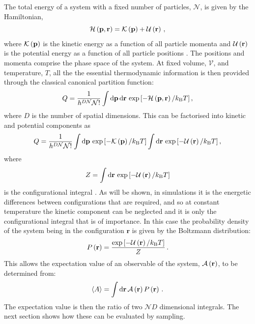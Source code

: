 The total energy of a system with a fixed number of particles, $\mathcal{N}$, is given by the Hamiltonian,
\begin{equation}
	\mathcal{H}\left(\mathbf{p},\mathbf{r}\right) = \mathcal{K}\left(\mathbf{p}\right)+\mathcal{U}\left(\mathbf{r}\right) \,,
\end{equation}
where $\mathcal{K}\left(\mathbf{p}\right)$ is the kinetic energy as a function of all particle momenta and $\mathcal{U}\left(\mathbf{r}\right)$ is the potential energy as a function of all particle positions \cite{Frenkel2002}.
The positions and momenta comprise the phase space of the system.
At fixed volume, $\mathcal{V}$, and temperature, $T$, all the the essential thermodynamic information is then provided through the classical canonical partition function:
\begin{equation}
	Q = \frac{1}{h^{D\mathcal{N}}\mathcal{N}!}\int \text{d}\mathbf{p}\,\text{d}\mathbf{r}\,\exp{\left[-\mathcal{H}\left(\mathbf{p},\mathbf{r}\right)/ k_\text{B}T\right]}\,,
\end{equation}
where $D$ is the number of spatial dimensions.
This can be factorised into kinetic and potential components as
\begin{equation}
	Q = \frac{1}{h^{D\mathcal{N}}\mathcal{N}!}\int \text{d}\mathbf{p}\,\exp{\left[-\mathcal{K}\left(\mathbf{p}\right)/k_\text{B}T\right]} \int \text{d}\mathbf{r}\,\exp{\left[-\mathcal{U}\left(\mathbf{r}\right)/k_\text{B}T\right]} \,,
\end{equation}
where
\begin{equation}
	Z = \int \text{d}\mathbf{r}\,\exp{\left[-\mathcal{U}\left(\mathbf{r}\right)/k_\text{B}T\right]}
\end{equation}
is the configurational integral \cite{Allen2017}. 
As will be shown, in \mc{} simulations it is the energetic differences between configurations that are required, and so at constant temperature the kinetic component can be neglected and it is only the configurational integral that is of importance.
In this case the probability density of the system being in the configuration $\mathbf{r}$ is given by the Boltzmann distribution:
\begin{equation}
	\label{eq:boltzmann}
	P\left(\mathbf{r}\right) = \frac{\exp{\left[-\mathcal{U}\left(\mathbf{r}\right)/k_\text{B}T\right]}}{Z}\,.
\end{equation}
This allows the expectation value of an observable of the system, $\mathcal{A}\left(\mathbf{r}\right)$, to be determined from:
\begin{equation}
	\label{eq:expectationobs}
		\langle A \rangle = \int \text{d}\mathbf{r}\,\mathcal{A}\left(\mathbf{r}\right) P\left(\mathbf{r}\right) \,.
\end{equation} 
The expectation value is then the ratio of two $\mathcal{N}D$ dimensional integrals.
The next section shows how these can be evaluated by \mc{} sampling.

